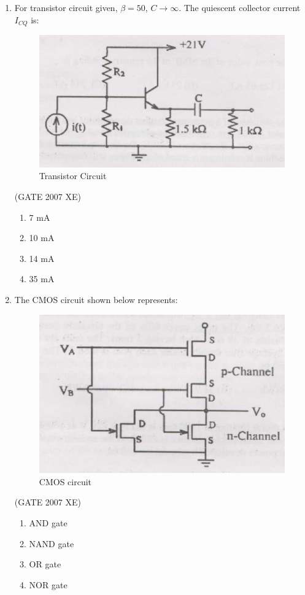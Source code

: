 \documentclass[journal,cmex10]{IEEEtran}
\theoremstyle{remark}
\numberwithin{equation}{enumi}
\numberwithin{figure}{enumi}
\begin{document}
\begin{enumerate}
    \item For transistor circuit given, $\beta=50$, $C \to \infty$. The quiescent collector current $I_{CQ}$ is:
    \begin{figure}[htbp]
  \centering
  \includegraphics[width=0.6\columnwidth]{figs/C/fig7.png}
  \caption{Transistor Circuit}
  \label{fig:C/fig7.png}
\end{figure}
    \hfill{(GATE 2007 XE)}
    \begin{multicols}{4}
    \begin{enumerate}
        \item 7 mA
        \item 10 mA
        \item 14 mA
        \item 35 mA
    \end{enumerate}
    \end{multicols}
    
    \newpage 
    
    \item The CMOS circuit shown below represents:
    \begin{figure}[htbp]
  \centering
  \includegraphics[width=0.6\columnwidth]{figs/C/fig8.png}
  \caption{CMOS circuit}
  \label{fig:C/fig8.png}
\end{figure}

    \hfill{(GATE 2007 XE)}
    \begin{multicols}{4}
    \begin{enumerate}
        \item AND gate
        \item NAND gate
        \item OR gate
        \item NOR gate
    \end{enumerate}
    \end{multicols}


\end{enumerate}
\end{document}
